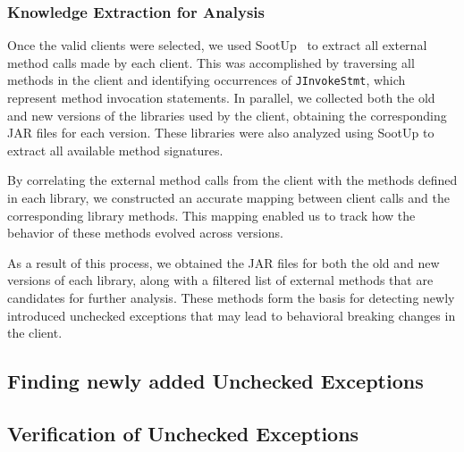 \subsubsection{Knowledge Extraction for Analysis}

Once the valid clients were selected, we used SootUp~\cite{Karakaya24:_sootup} to extract all external method calls made by each client. This was accomplished by traversing all methods in the client and identifying occurrences of \texttt{JInvokeStmt}, which represent method invocation statements. In parallel, we collected both the old and new versions of the libraries used by the client, obtaining the corresponding JAR files for each version. These libraries were also analyzed using SootUp to extract all available method signatures.

By correlating the external method calls from the client with the methods defined in each library, we constructed an accurate mapping between client calls and the corresponding library methods. This mapping enabled us to track how the behavior of these methods evolved across versions.

As a result of this process, we obtained the JAR files for both the old and new versions of each library, along with a filtered list of external methods that are candidates for further analysis. These methods form the basis for detecting newly introduced unchecked exceptions that may lead to behavioral breaking changes in the client.

\subsection{Finding newly added Unchecked Exceptions}
\subsection{Verification of Unchecked Exceptions}
